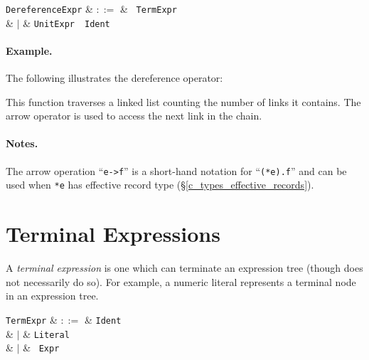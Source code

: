 \begin{syntax}
  \verb+DereferenceExpr+ & $::=$ & \token{*}\ \verb+TermExpr+\\
  & $|$ & \verb+UnitExpr+\ \token{->}\ \verb+Ident+\\
\end{syntax}

\paragraph{Example.} The following illustrates the dereference operator:



This function traverses a linked list counting the number of links it contains.  The arrow operator is used to access the next link in the chain.

\paragraph{Notes.} The arrow operation ``\lstinline{e->f}'' is a short-hand notation for ``\lstinline{(*e).f}'' and can be used when \lstinline{*e} has effective record type (\S\ref{c_types_effective_records}).



\section{Terminal Expressions}
\label{c_expr_term}

A {\em terminal expression} is one which can terminate an expression tree (though does not necessarily do so).  For example, a numeric literal represents a terminal node in an expression tree.

\begin{syntax}
  \verb+TermExpr+ & $::=$ & \verb+Ident+\\
  & $|$ & \verb+Literal+\\
  & $|$ & \token{(}\ \verb+Expr+\ \token{)}\\
\end{syntax}

